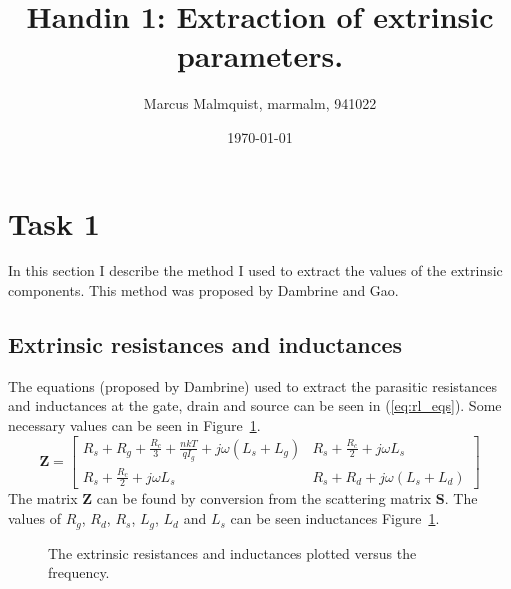 \documentclass[12pt,a4paper]{article}
\title{Handin 1: Extraction of extrinsic parameters.}
\author{Marcus Malmquist, marmalm, 941022}
\date{\today}
\begin{document}
\maketitle

\section{Task 1}\label{sec:1}
In this section I describe the method I used to extract the values of the extrinsic components. This method was proposed by Dambrine and Gao.

\subsection{Extrinsic resistances and inductances}\label{sec:1a}
The equations (proposed by Dambrine) used to extract the parasitic resistances and inductances at the gate, drain and source can be seen in (\ref{eq:rl_eqs}). Some necessary values can be seen in Figure~\ref{fig:rl_fig}.
\begin{equation}
  \label{eq:rl_eqs}
  \mathbf{Z}=
  \begin{bmatrix}
    R_s+R_g+\frac{R_c}{3}+\frac{nkT}{qI_g}+j\omega(L_s+L_g) & R_s+\frac{R_c}{2}+j\omega L_s \\
    R_s+\frac{R_c}{2}+j\omega L_s & R_s+R_d+j\omega(L_s+L_d)
  \end{bmatrix}
\end{equation}
The matrix $\mathbf{Z}$ can be found by conversion from the scattering matrix $\mathbf{S}$. The values of $R_g$, $R_d$, $R_s$, $L_g$, $L_d$ and $L_s$ can be seen inductances Figure~\ref{fig:rl_fig}.
\begin{figure}
  \centering
  \noindent{}
  \caption{The extrinsic resistances and inductances plotted versus the frequency.}
  \label{fig:rl_fig}
\end{figure}
\end{document}
